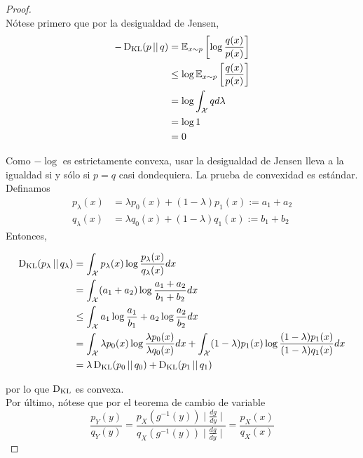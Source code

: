\documentclass[main.tex]{subfiles}
\begin{document}
\begin{proof} \ \\
Nótese primero que por la desigualdad de Jensen,
\begin{align*}
-\operatorname*{D_{KL}}(p\operatorname*{\mid\mid} q) 
	&= \mathbb{E}_{x\sim p}\left[\log\frac{q(x)}{p(x)}\right] \\
	&\leq\log\mathbb{E}_{x\sim p}\left[\frac{q(x)}{p(x)}\right] \\
	&= \log\int_\mathcal{X}qd\lambda\\
	&= \log 1 \\
	&= 0
\end{align*}

Como $-\log$ es estrictamente convexa, usar la desigualdad de Jensen lleva a la igualdad si y sólo si $p=q$ casi dondequiera.
La prueba de convexidad es estándar. Definamos
\begin{align*}
	p_\lambda(x) &= \lambda p_0(x) + (1-\lambda)p_1(x):=a_1+a_2 \\
	q_\lambda(x) &= \lambda q_0(x) + (1-\lambda)q_1(x):=b_1+b_2
\end{align*}
Entonces, 

\begin{align*}
\operatorname*{D_{KL}}(p_\lambda\operatorname*{\mid\mid} q_\lambda) &= \int_\mathcal{X}p_\lambda(x)\log\frac{p_\lambda(x)}{q_\lambda(x)}dx \\
&=\int_\mathcal{X}(a_1+a_2)\log\frac{a_1+a_2}{b_1+b_2}dx \\
&\leq \int_\mathcal{X}a_1\log\frac{a_1}{b_1}+a_2\log\frac{a_2}{b_2}dx \\
&= \int_\mathcal{X}\lambda p_0(x)\log\frac{\lambda p_0(x)}{\lambda q_0(x)}dx +\int_\mathcal{X}(1-\lambda) p_1(x)\log\frac{(1-\lambda) p_1(x)}{(1-\lambda) q_1(x)}dx \\
&= \lambda \operatorname*{D_{KL}}(p_0\operatorname*{\mid\mid} q_0) + \operatorname*{D_{KL}}(p_1\operatorname*{\mid\mid} q_1)
\end{align*}

por lo que $\operatorname*{D_{KL}}$ es convexa. \\

Por último, nótese que por el teorema de cambio de variable
\begin{equation*}
\frac{p_Y(y)}{q_Y(y)} =  \frac{p_X\left(g^{-1}(y)\right)\mid\frac{dg}{dy}\mid}{q_X\left(g^{-1}(y)\right)\mid\frac{dg}{dy}\mid} = 
\frac{p_X(x)}{q_X(x)}
\end{equation*}
\end{proof}
\end{document}
